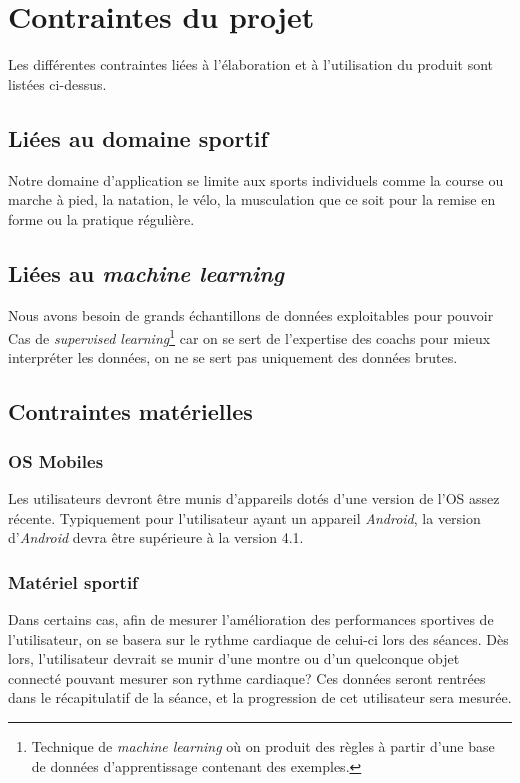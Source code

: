 \chapter{Contraintes du projet}

Les différentes contraintes liées à l'élaboration et à l'utilisation du produit sont listées ci-dessus.

\section{Liées au domaine sportif}

Notre domaine d'application se limite aux sports individuels comme la course ou marche à pied, la natation, le vélo, la musculation que ce soit pour la remise en forme ou la pratique régulière.

\section{Liées au \textit{machine learning}}

Nous avons besoin de grands échantillons de données exploitables pour pouvoir 
Cas de \textit{supervised learning}\footnote{Technique de \textit{machine learning} où on produit des règles à partir d'une base de données d'apprentissage contenant des exemples.} car on se sert de l'expertise des coachs pour mieux interpréter les données, on ne se sert pas uniquement des données brutes.

\section{Contraintes matérielles}

\subsection*{OS Mobiles}

Les utilisateurs devront être munis d'appareils dotés d'une version de l'OS assez récente. Typiquement pour l'utilisateur ayant un appareil \textit{Android}, la version d'\textit{Android} devra être supérieure à la version 4.1.

\subsection*{Matériel sportif}

Dans certains cas, afin de mesurer l'amélioration des performances sportives de l'utilisateur, on se basera sur le rythme cardiaque de celui-ci lors des séances. Dès lors, l'utilisateur devrait se munir d'une montre ou d'un quelconque objet connecté pouvant mesurer son rythme cardiaque? Ces données seront rentrées dans le récapitulatif de la séance, et la progression de cet utilisateur sera mesurée.


